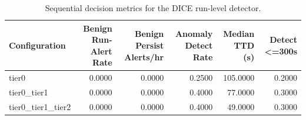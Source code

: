 \begin{table}[t]
\centering
\caption{Sequential decision metrics for the DICE run-level detector.}
\label{tab:dice_sequential_metrics}
\footnotesize
\begin{tabular}{lrrrrr}
\toprule
Configuration & Benign Run-Alert Rate & Benign Persist Alerts/hr & Anomaly Detect Rate & Median TTD (s) & Detect <=300s \\
\midrule
tier0 & 0.0000 & 0.0000 & 0.2500 & 105.0000 & 0.2000 \\
tier0_tier1 & 0.0000 & 0.0000 & 0.4000 & 77.0000 & 0.3000 \\
tier0_tier1_tier2 & 0.0000 & 0.0000 & 0.4000 & 49.0000 & 0.3000 \\
\bottomrule
\end{tabular}

\end{table}
